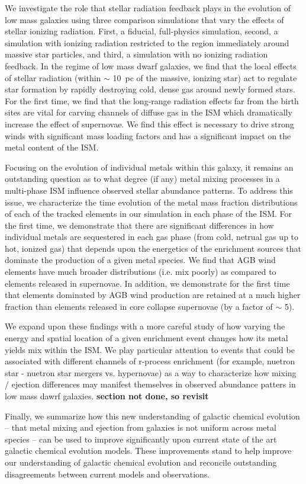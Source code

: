 We investigate the role that stellar radiation feedback plays in the evolution of low mass galaxies using three comparison simulations that vary the effects of stellar ionizing radiation. First, a fiducial, full-physics simulation, second, a simulation with ionizing radiation restricted to the region immediately around massive star particles, and third, a simulation with no ionizing radiation feedback. In the regime of low mass dwarf galaxies, we find that the local effects of stellar radiation (within $\sim$ 10~pc of the massive, ionizing star) act to regulate star formation by rapidly destroying cold, dense gas around newly formed stars. For the first time, we find that the long-range radiation effects far from the birth sites are vital for carving channels of diffuse gas in the ISM which dramatically increase the effect of supernovae. We find this effect is necessary to drive strong winds with significant mass loading factors and has a significant impact on the metal content of the ISM.

Focusing on the evolution of individual metals within this galaxy, it remains an outstanding question as to what degree (if any) metal mixing processes in a multi-phase ISM influence observed stellar abundance patterns. To address this issue, we characterize the time evolution of the metal mass fraction distributions of each of the tracked elements in our simulation in each phase of the ISM. For the first time, we demonstrate that there are significant differences in how individual metals are sequestered in each gas phase (from cold, netrual gas up to hot, ionized gas) that depends upon the energetics of the enrichment sources that dominate the production of a given metal species. We find that AGB wind elements have much broader distributions (i.e. mix poorly) as compared to elements released in supernovae. In addition, we demonstrate for the first time that elements dominated by AGB wind production are retained at a much higher fraction than elements released in core collapse supernovae (by a factor of $\sim$ 5).

We expand upon these findings with a more careful study of how varying the energy and spatial location of a given enrichment event changes how its metal yields mix within the ISM. We play particular attention to events that could be associated with different channels of r-process enrichment (for example, nuetron star - nuetron star mergers vs. hypernovae) as a way to characterize how mixing / ejection differences may manifest themselves in observed abundance patters in low mass dawrf galaxies. \textbf{section not done, so revisit}

Finally, we summarize how this new understanding of galactic chemical evolution -- that metal mixing and ejection from galaxies is not uniform across metal species -- can be used to improve significantly upon current state of the art galactic chemical evolution models. These improvements stand to help improve our understanding of galactic chemical evolution and reconcile outstanding disagreements between current models and observations.


